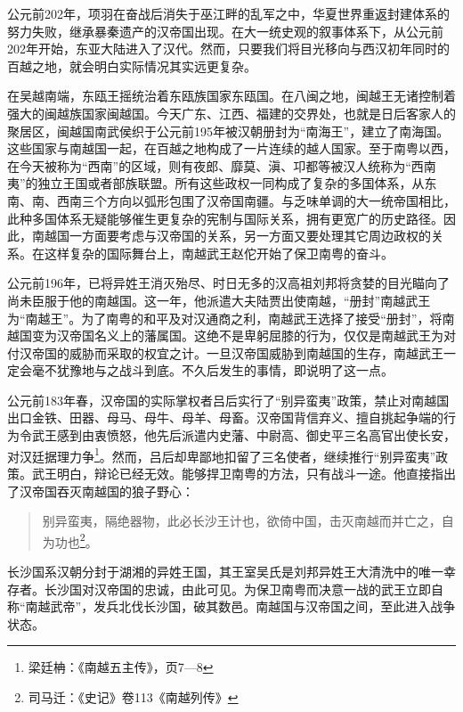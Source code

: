 公元前202年，项羽在奋战后消失于巫江畔的乱军之中，华夏世界重返封建体系的努力失败，继承暴秦遗产的汉帝国出现。在大一统史观的叙事体系下，从公元前202年开始，东亚大陆进入了汉代。然而，只要我们将目光移向与西汉初年同时的百越之地，就会明白实际情况其实远更复杂。

在吴越南端，东瓯王摇统治着东瓯族国家东瓯国。在八闽之地，闽越王无诸控制着强大的闽越族国家闽越国。今天广东、江西、福建的交界处，也就是日后客家人的聚居区，闽越国南武侯织于公元前195年被汉朝册封为“南海王”，建立了南海国。这些国家与南越国一起，在百越之地构成了一片连续的越人国家。至于南粤以西，在今天被称为“西南”的区域，则有夜郎、靡莫、滇、卭都等被汉人统称为“西南夷”的独立王国或者部族联盟。所有这些政权一同构成了复杂的多国体系，从东南、南、西南三个方向以弧形包围了汉帝国南疆。与乏味单调的大一统帝国相比，此种多国体系无疑能够催生更复杂的宪制与国际关系，拥有更宽广的历史路径。因此，南越国一方面要考虑与汉帝国的关系，另一方面又要处理其它周边政权的关系。在这样复杂的国际舞台上，南越武王赵佗开始了保卫南粤的奋斗。

公元前196年，已将异姓王消灭殆尽、时日无多的汉高祖刘邦将贪婪的目光瞄向了尚未臣服于他的南越国。这一年，他派遣大夫陆贾出使南越，“册封”南越武王为“南越王”。为了南粤的和平及对汉通商之利，南越武王选择了接受“册封”，将南越国变为汉帝国名义上的藩属国。这绝不是卑躬屈膝的行为，仅仅是南越武王为对付汉帝国的威胁而采取的权宜之计。一旦汉帝国威胁到南越国的生存，南越武王一定会毫不犹豫地与之战斗到底。不久后发生的事情，即说明了这一点。

公元前183年春，汉帝国的实际掌权者吕后实行了“别异蛮夷”政策，禁止对南越国出口金铁、田器、母马、母牛、母羊、母畜。汉帝国背信弃义、擅自挑起争端的行为令武王感到由衷愤怒，他先后派遣内史藩、中尉高、御史平三名高官出使长安，对汉廷据理力争\footnote{ 梁廷柟：《南越五主传》，页7—8}。然而，吕后却卑鄙地扣留了三名使者，继续推行“别异蛮夷”政策。武王明白，辩论已经无效。能够捍卫南粤的方法，只有战斗一途。他直接指出了汉帝国吞灭南越国的狼子野心：

\begin{quote}
	别异蛮夷，隔绝器物，此必长沙王计也，欲倚中国，击灭南越而并亡之，自为功也\footnote{司马迁：《史记》卷113《南越列传》}。
\end{quote}

长沙国系汉朝分封于湖湘的异姓王国，其王室吴氏是刘邦异姓王大清洗中的唯一幸存者。长沙国对汉帝国的忠诚，由此可见。为保卫南粤而决意一战的武王立即自称“南越武帝”，发兵北伐长沙国，破其数邑。南越国与汉帝国之间，至此进入战争状态。

